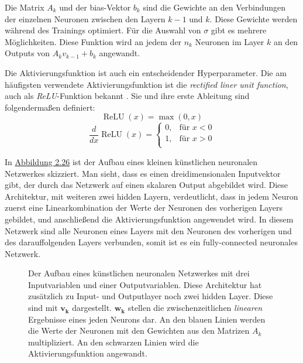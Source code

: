 Die Matrix $A_k$ und der bias-Vektor $b_k$ sind die Gewichte an den Verbindungen der einzelnen Neuronen zwischen den Layern $k-1$ und $k$.
Diese Gewichte werden w\"ahrend des Trainings optimiert. F\"ur die Auswahl von $\sigma$ gibt es mehrere M\"oglichkeiten. Diese Funktion wird an jedem der
$n_k$ Neuronen im Layer $k$ an den Outputs von $A_k v_{k-1} + b_k$ angewandt.

Die Aktivierungsfunktion ist auch ein entscheidender Hyperparameter. Die am h\"aufigsten verwendete Aktivierungsfunktion ist die \textit{rectified liner unit function},
auch als \textit{ReLU}-Funktion bekannt \cite{activation}. Sie und ihre erste Ableitung sind folgenderma{\ss}en definiert:
$$ \operatorname{ReLU}(x) = \max(0,x)$$
$$ \frac{d}{dx}\operatorname{ReLU}(x) =
	\left\{
	\begin{array}{lr}
		0, & \text{für }x < 0 \\
		1, & \text{für }x > 0 \\
	\end{array}
	\right.
$$


In \hyperref[fig:nn]{Abbildung 2.26} ist der Aufbau eines kleinen k\"unstlichen neuronalen Netzwerkes skizziert. Man sieht, dass es einen dreidimensionalen Inputvektor gibt, der
durch das Netzwerk auf einen skalaren Output abgebildet wird. Diese Architektur, mit weiteren zwei hidden Layern, verdeutlicht, dass in jedem Neuron zuerst eine Linearkombination der
Werte der Neuronen des vorherigen Layers gebildet, und anschlie{\ss}end die Aktivierungsfunktion angewendet wird. In diesem Netzwerk sind alle Neuronen eines Layers mit den Neuronen
des vorherigen und des darauffolgenden Layers verbunden, somit ist es ein fully-connected neuronales Netzwerk.

\begin{figure}[ht]
	\label{fig:nn}
	\begin{center}
	\end{center}
	\caption[K\"unstliches Neuronales Netzwerk]
	{Der Aufbau eines k\"unstlichen neuronalen Netzwerkes mit drei Inputvariablen und einer Outputvariablen. Diese Architektur hat zus\"atzlich zu Input- und Outputlayer
		noch zwei hidden Layer. Diese sind mit $\mathbf{v_k}$ dargestellt. $\mathbf{w_k}$ stellen die zwischenzeitlichen \textit{linearen} Ergebnisse eines jeden Neurons dar.
		An den blauen Linien werden die Werte der Neuronen mit den Gewichten aus den Matrizen $A_k$ multipliziert. An den schwarzen Linien wird die Aktivierungsfunktion angewandt.}
\end{figure}

